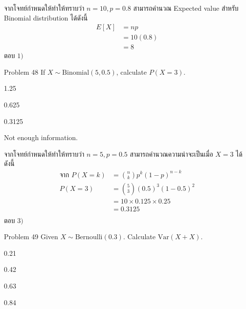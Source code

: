 \documentclass[11pt]{scrartcl}
\renewcommand{\binom}[2]{\genfrac{(}{)}{0pt}{0}{#1}{#2}}
\begin{document}
\begin{solutionbox}
  จากโจทย์กำหนดให้ทำให้ทราบว่า $n=10, p=0.8$ สามารถคำนวณ Expected value สำหรับ Binomial distribution ได้ดังนี้
  \begin{align*}
    E[X] &= np \\
          &= 10(0.8) \\
          &= 8
  \end{align*}
  ตอบ $\boxed{1)}$
\end{solutionbox}

\newpage

\begin{problembox}{Problem 48}
If $X \sim \text{Binomial}(5, 0.5)$, calculate $P(X = 3)$.
 
\begin{choices}
\item 1.25
\item 0.625
\item 0.3125
\item Not enough information.
\end{choices}
\end{problembox}
 
\begin{solutionbox}
  จากโจทย์กำหนดให้ทำให้ทราบว่า $n=5, p=0.5$ สามารถคำนวณความน่าจะเป็นเมื่อ $X=3$ ได้ดังนี้
  \begin{align*}
    \text{จาก } P(X=k) &= \binom{n}{k}p^k (1-p)^{n-k} \\
                P(X=3) &= \binom{5}{3}(0.5)^3(1-0.5)^2 \\
                       &= 10 \times 0.125 \times 0.25 \\
                       &= 0.3125 \\
  \end{align*}
  ตอบ $\boxed{3)}$
\end{solutionbox}

\newpage

\begin{problembox}{Problem 49}
Given $X \sim \text{Bernoulli}(0.3)$. Calculate $\text{Var}(X + X)$.
 
\begin{choices}
\item 0.21
\item 0.42
\item 0.63
\item 0.84
\end{choices}
\end{problembox}
\end{document}
